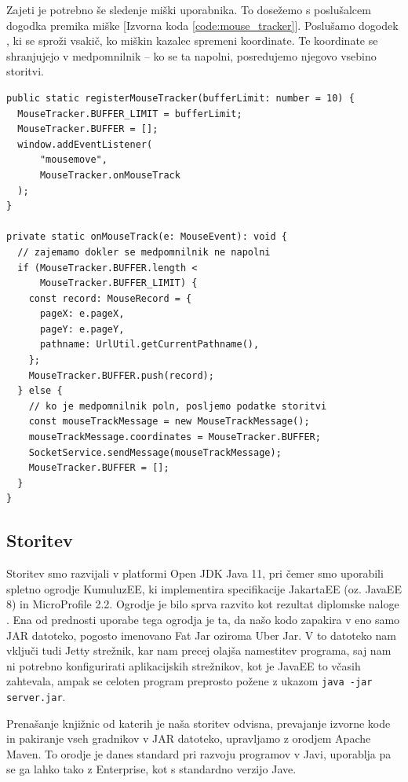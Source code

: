 \documentclass[a4paper, 12pt]{book}
\begin{document}
Zajeti je potrebno še sledenje miški uporabnika. To dosežemo s poslušalcem dogodka premika miške [Izvorna koda \ref{code:mouse_tracker}]. Poslušamo dogodek , ki se sproži vsakič, ko miškin kazalec spremeni koordinate. Te koordinate se shranjujejo v medpomnilnik -- ko se ta napolni, posredujemo njegovo vsebino storitvi.

\begin{lstlisting}[label=code:mouse_tracker, caption=Spremljanje premikov miške]
public static registerMouseTracker(bufferLimit: number = 10) {
  MouseTracker.BUFFER_LIMIT = bufferLimit;
  MouseTracker.BUFFER = [];
  window.addEventListener(
      "mousemove",
      MouseTracker.onMouseTrack
  );
}

private static onMouseTrack(e: MouseEvent): void {
  // zajemamo dokler se medpomnilnik ne napolni
  if (MouseTracker.BUFFER.length < 
      MouseTracker.BUFFER_LIMIT) {
    const record: MouseRecord = {
      pageX: e.pageX,
      pageY: e.pageY,
      pathname: UrlUtil.getCurrentPathname(),
    };
    MouseTracker.BUFFER.push(record);
  } else {
    // ko je medpomnilnik poln, posljemo podatke storitvi
    const mouseTrackMessage = new MouseTrackMessage();
    mouseTrackMessage.coordinates = MouseTracker.BUFFER;
    SocketService.sendMessage(mouseTrackMessage);
    MouseTracker.BUFFER = [];
  }
}
\end{lstlisting} 

\subsection{Storitev}
\label{ch3:sec2:sub2}

Storitev smo razvijali v platformi Open JDK Java 11, pri čemer smo uporabili spletno ogrodje KumuluzEE, ki implementira specifikacije JakartaEE (oz. JavaEE 8) in MicroProfile 2.2. Ogrodje je bilo sprva razvito kot rezultat diplomske naloge \cite{kumuluz_diploma}. Ena od prednosti uporabe tega ogrodja je ta, da našo kodo zapakira v eno samo JAR datoteko, pogosto imenovano Fat Jar oziroma Uber Jar. V to datoteko nam vključi tudi Jetty strežnik, kar nam precej olajša namestitev programa, saj nam ni potrebno konfigurirati aplikacijskih strežnikov, kot je JavaEE to včasih zahtevala, ampak se celoten program preprosto požene z ukazom \verb|java -jar server.jar|.

Prenašanje knjižnic od katerih je naša storitev odvisna, prevajanje izvorne kode in pakiranje vseh gradnikov v JAR datoteko, upravljamo z orodjem Apache Maven. To orodje je danes standard pri razvoju programov v Javi, uporablja pa se ga lahko tako z Enterprise, kot s standardno verzijo Jave.
\end{document}
